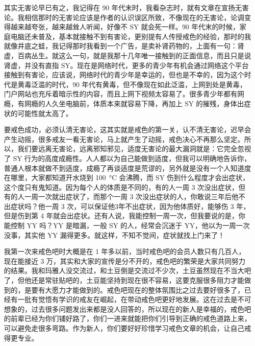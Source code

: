 \documentclass{ctexart}
\begin{document}
其实无害论早已有之，我记得在 90 年代末时，我看杂志时，就有文章在宣扬无害论。我相信那时的无害论应该是作者的认识误区所致，不像现在的无害论，论调变得越来越夸张，越来越耸人听闻，好像不 SY 就会死一样。90 年代末的时候，家庭电脑还未普及，基本就接触不到有害论，更别提有人传授戒色的经验，那时的我就像井底之蛙，我记得那时我看到一个广告，是卖补肾药物的，上面有一句：肾虚，百病丛生。就这么一句，就是我那十几年唯一接触到的正面信息，而且只是说肾虚，并没有直指 SY。现在是网络时代，更多的青少年有机会通过网络这个平台接触到有害论，应该说，网络时代的青少年是幸运的，但也是不幸的，因为这个时代是黄毒泛滥的时代，90 年代有黄毒，但不像现在如此泛滥，上网到处是黄毒，门户网站也充斥着暗示性的内容，而且上网下视频太容易了。很多青少年都有网瘾，有网瘾的人久坐电脑前，体质本来就容易下降，再加上 SY 的摧残，身体出症状的可能性就太高了。

要戒色成功，必须认清无害论，这其实就是戒色的第一关，认不清无害论，迟早会产生动摇，很多戒友一看无害论，马上就产生了动摇，戒色决心不再那么坚定。所以，我们要远离无害论，远离邪知邪见，适度无害论的最大漏洞就是：它完全忽视了 SY 行为的高度成瘾性。人人都以为自己能做到适度，但我可以明确地告诉你，普通人根本就做不到适度，成瘾了再谈适度是荒谬的，另外就是没有一个人知道度在哪里，大家都知道开水烧到 \SI{100}{\degreeCelsius} 会沸腾，而 SY 伤到什么程度才会出症状，这个度只有鬼知道。因为每个人的体质是不同的，有的人一周 3 次没出症状，但有的人一周一次就出症状了，而那个一周 3 次没出症状的人，你敢说三年后他不出症状吗？他一周 3 次，可以保证他3年不出症状，因为他体质好，能够伤 3 年，但是伤到第 4 年就会出症状。还有人说，我能控制一周一次，但我要说的是，你能控制 YY 吗？YY 是暗漏，一般 SY 的人，经常会沉迷于 YY，他以为一周一次没事，其实他 YY 漏得更多。就这样，不知不觉间，症状就找上门来了！

我第一次来戒色吧时大概是在 1 年多以前，当时戒色吧的会员人数只有几百人，现在能接近 3 万，其实和大家的宣传是分不开的，戒色吧的繁荣是大家共同努力的结果。我和玛雅人没交流过，和土豆倒是交流过不少次，土豆虽然现在不当大吧了，但他还是常驻贴吧的，土豆能坚持到现在很不容易，这要克服很多阻力才能做到的，是要有大愿力才能做到的。戒色吧现在的整体氛围比之过去要好很多了，已经有一批有觉悟有学识的戒友在崛起，在带动戒色吧更好地发展。这在过去是不可想象的，过去很多问题发出来都是没人回答的，所以现在的新人是幸福的，戒色吧的前辈已经为你们铺好路了，你们一进来就能把你们引导到正确的戒色道路上来，可以避免走很多弯路。作为新人，你们要好好珍惜学习戒色文章的机会，让自己戒得更专业。
\end{document}
